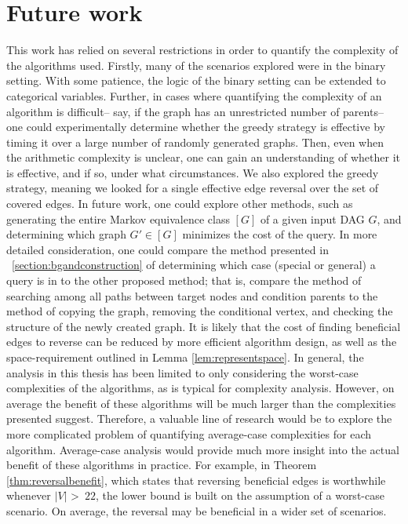 \section{Future work} 
\null \quad \quad This work has relied on several restrictions in order to quantify the complexity of the algorithms used. Firstly, many of the scenarios explored were in the binary setting. With some patience, the logic of the binary setting can be extended to categorical variables. Further, in cases where quantifying the complexity of an algorithm is difficult-- say, if the graph has an unrestricted number of parents-- one could experimentally determine whether the greedy strategy is effective by timing it over a large number of randomly generated graphs. Then, even when the arithmetic complexity is unclear, one can gain an understanding of whether it is effective, and if so, under what circumstances. \newline
\null \quad \quad We also explored the greedy strategy, meaning we looked for a single effective edge reversal over the set of covered edges. In future work, one could explore other methods, such as generating the entire Markov equivalence class $[G]$ of a given input DAG $G$, and determining which graph $G' \in [G]$ minimizes the cost of the query. \newline
\null \quad \quad In more detailed consideration, one could compare the method presented in ~\cref{section:bgandconstruction} of determining which case (special or general) a query is in to the other proposed method; that is, compare the method of searching among all paths between target nodes and condition parents to the method of copying the graph, removing the conditional vertex, and checking the structure of the newly created graph.\newline
\null \quad \quad It is likely that the cost of finding beneficial edges to reverse can be reduced by more efficient algorithm design, as well as the space-requirement outlined in Lemma \ref{lem:representspace}.\newline
\null \quad \quad In general, the analysis in this thesis has been limited to only considering the worst-case complexities of the algorithms, as is typical for complexity analysis. However, on average the benefit of these algorithms will be much larger than the complexities presented suggest. Therefore, a valuable line of research would be to explore the more complicated problem of quantifying average-case complexities for each algorithm. Average-case analysis would provide much more insight into the actual benefit of these algorithms in practice. For example, in Theorem \ref{thm:reversalbenefit}, which states that reversing beneficial edges is worthwhile whenever $|V|$ \textgreater \  $22$, the lower bound is built on the assumption of a worst-case scenario. On average, the reversal may be beneficial in a wider set of scenarios. 
